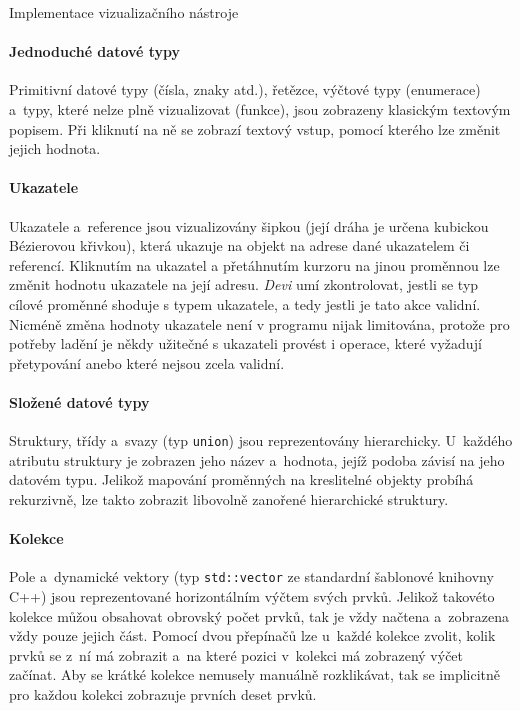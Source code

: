 \documentclass[czech,bachelor,male,python,dept460,hidelinks]{diploma}						%
\begin{document}
\begin{section}{Implementace vizualizačního nástroje}
	
	\paragraph*{Jednoduché datové typy} Primitivní datové typy (čísla, znaky atd.), řetězce, výčtové typy (enumerace) a~typy, které nelze plně vizualizovat
	(funkce), jsou zobrazeny klasickým textovým popisem. Při kliknutí na ně se zobrazí textový vstup, pomocí kterého lze změnit jejich hodnota.
	\paragraph*{Ukazatele} Ukazatele a~reference jsou vizualizovány šipkou (její dráha je určena kubickou Bézierovou křivkou), která ukazuje na objekt na adrese
	dané ukazatelem či referencí. Kliknutím na ukazatel a přetáhnutím kurzoru na jinou proměnnou lze změnit hodnotu ukazatele na její adresu.
	\textit{Devi} umí zkontrolovat, jestli se typ cílové proměnné shoduje s typem ukazatele, a tedy jestli je tato akce validní. Nicméně změna hodnoty
	ukazatele není v programu nijak limitována, protože pro potřeby ladění je někdy užitečné s ukazateli provést i operace, které vyžadují přetypování anebo
	které nejsou zcela validní.
	\paragraph*{Složené datové typy} Struktury, třídy a~svazy (typ \texttt{union}) jsou reprezentovány hierarchicky. U~každého atributu struktury je zobrazen jeho
	název a~hodnota, jejíž podoba závisí na jeho datovém typu. Jelikož mapování proměnných na kreslitelné objekty probíhá rekurzivně, lze takto zobrazit
	libovolně zanořené hierarchické struktury.
	\paragraph*{Kolekce} Pole a~dynamické vektory (typ \texttt{std::vector} ze standardní šablonové knihovny C++) jsou reprezentované horizontálním výčtem svých prvků.
	Jelikož takovéto kolekce můžou obsahovat obrovský počet prvků, tak je vždy načtena a~zobrazena vždy pouze jejich část. Pomocí dvou přepínačů lze u~každé
	kolekce zvolit, kolik prvků se z~ní má zobrazit a~na které pozici v~kolekci má zobrazený výčet začínat. Aby se krátké kolekce nemusely manuálně rozklikávat,
	tak se implicitně pro každou kolekci zobrazuje prvních deset prvků.
	

\end{section}
\end{document}
